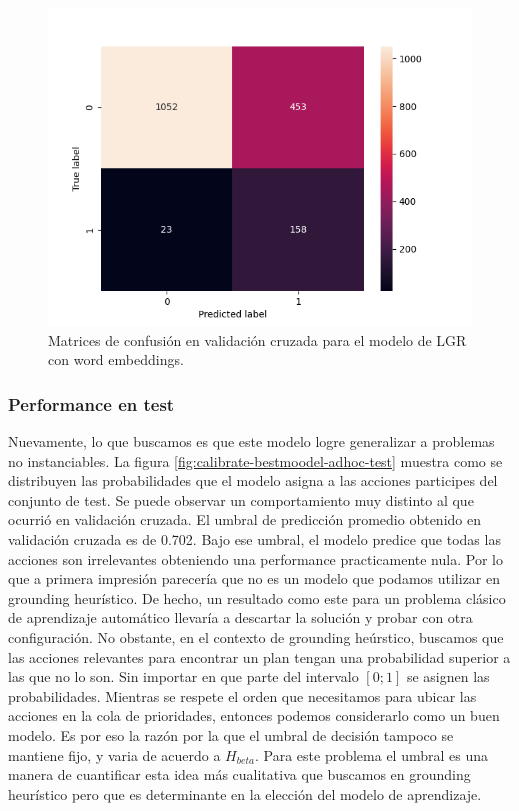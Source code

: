 \begin{figure}[t!]
    \includegraphics[width=\linewidth]{figures/results/ad-hoc/nn/calibrate/2021-12-06_17.03.17.314982_set_5_confusion_matrix_raw.png}
    \endminipage
    \caption{Matrices de confusión en validación cruzada para el modelo de LGR con word embeddings.}
    \label{fig:calibrate-bestmodel-cm}
\end{figure}

\subsubsection{Performance en test}

Nuevamente, lo que buscamos es que este modelo logre generalizar a problemas no
instanciables. La figura \ref{fig:calibrate-bestmoodel-adhoc-test} muestra como
se distribuyen las probabilidades que el modelo asigna a las acciones participes
del conjunto de test. Se puede observar un comportamiento muy distinto al que
ocurrió en validación cruzada. El umbral de predicción promedio obtenido en
validación cruzada es de 0.702. Bajo ese umbral, el modelo predice que todas las
acciones son irrelevantes obteniendo una performance practicamente nula. Por lo
que a primera impresión parecería que no es un modelo que podamos utilizar en
grounding heurístico. De hecho, un resultado como este para un problema clásico
de aprendizaje automático llevaría a descartar la solución y probar con otra
configuración. No obstante, en el contexto de grounding heúrstico, buscamos que
las acciones relevantes para encontrar un plan tengan una probabilidad superior
a las que no lo son. Sin importar en que parte del intervalo $[0;1]$ se asignen
las probabilidades. Mientras se respete el orden que necesitamos para ubicar las
acciones en la cola de prioridades, entonces podemos considerarlo como un buen
modelo. Es por eso la razón por la que el umbral de decisión tampoco se mantiene
fijo, y varia de acuerdo a $H_{beta}$. Para este problema el umbral es una
manera de cuantificar esta idea más cualitativa que buscamos en grounding
heurístico pero que es determinante en la elección del modelo de aprendizaje.

